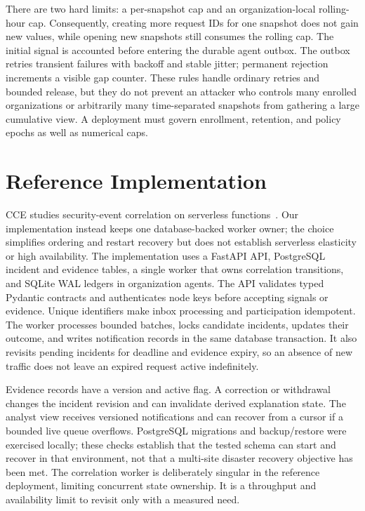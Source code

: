 \documentclass[conference,letterpaper]{IEEEtran}
\begin{document}
There are two hard limits: a per-snapshot cap and an organization-local rolling-hour cap. Consequently, creating more request IDs for one snapshot does not gain new values, while opening new snapshots still consumes the rolling cap. The initial signal is accounted before entering the durable agent outbox. The outbox retries transient failures with backoff and stable jitter; permanent rejection increments a visible gap counter. These rules handle ordinary retries and bounded release, but they do not prevent an attacker who controls many enrolled organizations or arbitrarily many time-separated snapshots from gathering a large cumulative view. A deployment must govern enrollment, retention, and policy epochs as well as numerical caps.

\section{Reference Implementation}
CCE studies security-event correlation on serverless functions~\cite{cce}. Our implementation instead keeps one database-backed worker owner; the choice simplifies ordering and restart recovery but does not establish serverless elasticity or high availability.
The implementation uses a FastAPI API, PostgreSQL incident and evidence tables, a single worker that owns correlation transitions, and SQLite WAL ledgers in organization agents. The API validates typed Pydantic contracts and authenticates node keys before accepting signals or evidence. Unique identifiers make inbox processing and participation idempotent. The worker processes bounded batches, locks candidate incidents, updates their outcome, and writes notification records in the same database transaction. It also revisits pending incidents for deadline and evidence expiry, so an absence of new traffic does not leave an expired request active indefinitely.

Evidence records have a version and active flag. A correction or withdrawal changes the incident revision and can invalidate derived explanation state. The analyst view receives versioned notifications and can recover from a cursor if a bounded live queue overflows. PostgreSQL migrations and backup/restore were exercised locally; these checks establish that the tested schema can start and recover in that environment, not that a multi-site disaster recovery objective has been met. The correlation worker is deliberately singular in the reference deployment, limiting concurrent state ownership. It is a throughput and availability limit to revisit only with a measured need.
\end{document}
